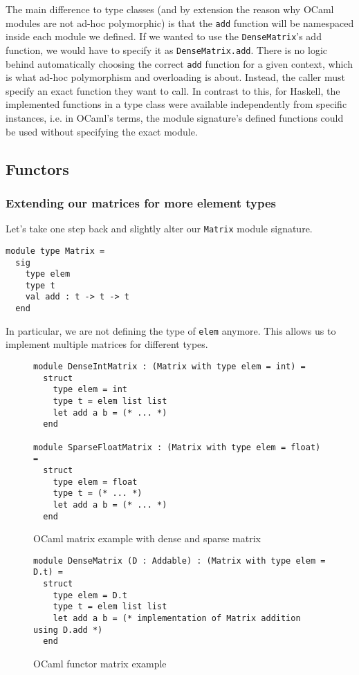 The main difference to type classes (and by extension the reason why OCaml modules are not ad-hoc polymorphic) is that the \verb|add| function will be namespaced inside each module we defined. If we wanted to use the \verb|DenseMatrix|'s add function, we would have to specify it as \verb|DenseMatrix.add|. There is no logic behind automatically choosing the correct \verb|add| function for a given context, which is what ad-hoc polymorphism and overloading is about. Instead, the caller must specify an exact function they want to call. In contrast to this, for Haskell, the implemented functions in a type class were available independently from specific instances, i.e. in OCaml's terms, the module signature's defined functions could be used without specifying the exact module.

\subsection{Functors}

\subsubsection{Extending our matrices for more element types}

Let's take one step back and slightly alter our \verb|Matrix| module signature.
\begin{verbatim}
module type Matrix =
  sig
    type elem
    type t
    val add : t -> t -> t
  end
\end{verbatim}
In particular, we are not defining the type of \verb|elem| anymore. This allows us to implement multiple matrices for different types.

\begin{figure*}
\begin{verbatim}
module DenseIntMatrix : (Matrix with type elem = int) =
  struct
    type elem = int
    type t = elem list list
    let add a b = (* ... *)
  end

module SparseFloatMatrix : (Matrix with type elem = float) =
  struct
    type elem = float
    type t = (* ... *)
    let add a b = (* ... *)
  end
\end{verbatim}
\caption{OCaml matrix example with dense and sparse matrix}
\label{ocaml-all-matrix}
\end{figure*}

\begin{figure*}
\begin{verbatim}
module DenseMatrix (D : Addable) : (Matrix with type elem = D.t) =
  struct
    type elem = D.t
    type t = elem list list
    let add a b = (* implementation of Matrix addition using D.add *)
  end
\end{verbatim}
\caption{OCaml functor matrix example}
\label{ocaml-matrix-functor}
\end{figure*}

